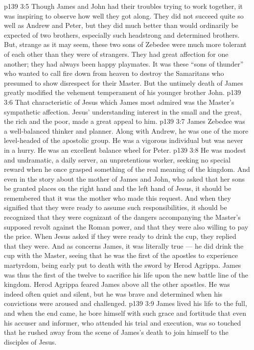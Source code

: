 \vs p139 3:5 Though James and John had their troubles trying to work together, it was inspiring to observe how well they got along. They did not succeed quite so well as Andrew and Peter, but they did much better than would ordinarily be expected of two brothers, especially such headstrong and determined brothers. But, strange as it may seem, these two sons of Zebedee were much more tolerant of each other than they were of strangers. They had great affection for one another; they had always been happy playmates. It was these “sons of thunder” who wanted to call fire down from heaven to destroy the Samaritans who presumed to show disrespect for their Master. But the untimely death of James greatly modified the vehement temperament of his younger brother John.
\vs p139 3:6 \pc That characteristic of Jesus which James most admired was the Master’s sympathetic affection. Jesus’ understanding interest in the small and the great, the rich and the poor, made a great appeal to him.
\vs p139 3:7 \pc James Zebedee was a well\hyp{}balanced thinker and planner. Along with Andrew, he was one of the more level\hyp{}headed of the apostolic group. He was a vigorous individual but was never in a hurry. He was an excellent balance wheel for Peter.
\vs p139 3:8 He was modest and undramatic, a daily server, an unpretentious worker, seeking no special reward when he once grasped something of the real meaning of the kingdom. And even in the story about the mother of James and John, who asked that her sons be granted places on the right hand and the left hand of Jesus, it should be remembered that it was the mother who made this request. And when they signified that they were ready to assume such responsibilities, it should be recognized that they were cognizant of the dangers accompanying the Master’s supposed revolt against the Roman power, and that they were also willing to pay the price. When Jesus asked if they were ready to drink the cup, they replied that they were. And as concerns James, it was literally true --- he did drink the cup with the Master, seeing that he was the first of the apostles to experience martyrdom, being early put to death with the sword by Herod Agrippa. James was thus the first of the twelve to sacrifice his life upon the new battle line of the kingdom. Herod Agrippa feared James above all the other apostles. He was indeed often quiet and silent, but he was brave and determined when his convictions were aroused and challenged.
\vs p139 3:9 \pc James lived his life to the full, and when the end came, he bore himself with such grace and fortitude that even his accuser and informer, who attended his trial and execution, was so touched that he rushed away from the scene of James’s death to join himself to the disciples of Jesus.
